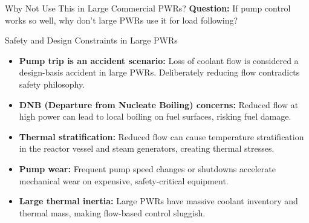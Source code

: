 \documentclass[aspectratio=169]{beamer}
\begin{document}
\begin{frame}[allowframebreaks]{Why Not Use This in Large Commercial PWRs?}
    \textbf{Question:} If pump control works so well, why don't large PWRs use it for load following?

    \vspace{1em}
    \begin{alertblock}{Safety and Design Constraints in Large PWRs}
        \begin{itemize}
            \item \textbf{Pump trip is an accident scenario:} Loss of coolant flow is considered a design-basis accident in large PWRs. Deliberately reducing flow contradicts safety philosophy.
            \item \textbf{DNB (Departure from Nucleate Boiling) concerns:} Reduced flow at high power can lead to local boiling on fuel surfaces, risking fuel damage.
            \item \textbf{Thermal stratification:} Reduced flow can cause temperature stratification in the reactor vessel and steam generators, creating thermal stresses.
            \item \textbf{Pump wear:} Frequent pump speed changes or shutdowns accelerate mechanical wear on expensive, safety-critical equipment.
            \item \textbf{Large thermal inertia:} Large PWRs have massive coolant inventory and thermal mass, making flow-based control sluggish.
        \end{itemize}
    \end{alertblock}
\end{frame}
\end{document}

